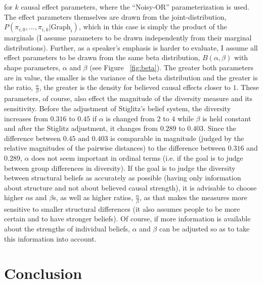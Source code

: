 \documentclass[12pt]{article}
\begin{document}
for $k$ causal effect parameters, where the ``Noisy-OR'' parameterization is used. The effect parameters themselves are drawn from the joint-distribution, $P(\pi_{i, 0}, \ldots, \pi_{i, k} | \text{Graph}_i)$, which in this case is simply the product of the marginals (I assume parameters to be drawn independently from their marginal distributions). Further, as a speaker's emphasis is harder to evaluate, I assume all effect parameters to be drawn from the same beta distribution, $B(\alpha, \beta)$ with shape parameters, $\alpha$ and $\beta$ (see Figure ~\ref{fig:beta}). The greater both parameters are in value, the smaller is the variance of the beta distribution and the greater is the ratio, $\frac{\alpha}{\beta}$, the greater is the density for believed causal effects closer to $1$. These parameters, of course, also effect the magnitude of the diversity measure and its sensitivity. Before the adjustment of Stiglitz's belief system, the diversity increases from $0.316$ to $0.45$ if $\alpha$ is changed from $2$ to $4$ while $\beta$ is held constant and after the Stiglitz adjustment, it changes from $0.289$ to $0.403$. Since the difference between $0.45$ and $0.403$ is comparable in magnitude (judged by the relative magnitudes of the pairwise distances) to the difference between $0.316$ and $0.289$, $\alpha$ does not seem important in ordinal terms (i.e. if the goal is to judge between group differences in diversity). If the goal is to judge the diversity between structural beliefs as accurately as possible (having only information about structure and not about believed causal strength), it is advisable to choose higher $\alpha$s and $\beta$s, as well as higher ratios, $\frac{\alpha}{\beta}$, as that makes the measures more sensitive to smaller structural differences (it also assumes people to be more certain and to have stronger beliefs). Of course, if more information is available about the strengths of individual beliefs, $\alpha$ and $\beta$ can be adjusted so as to take this information into account.

\section{Conclusion}

\end{document}
